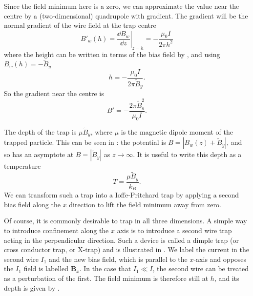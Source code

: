 Since the field minimum here is a zero, we can approximate the value near the
centre by a (two-dimensional) quadrupole with gradient. The gradient will be
the normal gradient of the wire field at the trap centre
%
\begin{equation}
  B'_w(h) = \left.\frac{\dd B_w}{\dd z}\right|_{z=h} = - \frac{\mu_0 I}{2\pi
      h^2}
\end{equation}
%
where the height can be written in terms of the bias field by
, and using $B_w(h) = -\tilde{B}_y$
%
\begin{equation}
  h = -\frac{\mu_0 I}{2\pi \tilde{B}_y}.
\end{equation}
%
So the gradient near the centre is
%
\begin{equation}
  B' = -\frac{2\pi \tilde{B}_y^2}{\mu_0 I}.
\end{equation}

The depth of the trap is $\mu \tilde{B}_y$, where $\mu$ is the magnetic dipole
moment of the trapped particle. This can be seen in
: the potential is $B = |B_w(z) +
\tilde{B}_y|$, and so has an asymptote at $B=|\tilde{B}_y|$ as
$z\rightarrow\infty$. It is useful to write this depth as a temperature
%
\begin{equation}
  T  = \frac{\mu \tilde{B}_y}{k_B}.
  \label{theory:eqn:depth}
\end{equation}
%
We can transform such a trap into a Ioffe-Pritchard trap by applying a second
bias field along the $x$ direction to lift the field minimum away from
zero.

Of course, it is commonly desirable to trap in all three dimensions. A simple
way to introduce confinement along the $x$ axis is to introduce a second wire
trap acting in the perpendicular direction. Such a device is called a dimple
trap (or cross conductor trap, or X-trap) and is illustrated in
. We label the current in the second wire $I_1$
and the new bias field, which is parallel to the $x$-axis and opposes the
$I_1$ field is labelled $\mathbf{B}_x$. In the case that $I_1 \ll I$, the
second wire can be treated as a perturbation of the first. The field minimum is
therefore still at $h$, and its depth is given by .

